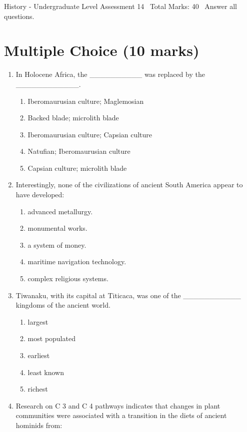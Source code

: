 \documentclass[12pt]{article}
\begin{document}
\begin{center}
History - Undergraduate Level Assessment 14 \
Total Marks: 40 \
Answer all questions.
\end{center}

\section*{Multiple Choice (10 marks)}
\begin{enumerate}[label=\arabic*.]
\item In Holocene Africa, the \_\_\_\_\_\_\_\_\_\_ was replaced by the \_\_\_\_\_\_\_\_\_\_\_\_.
\begin{enumerate}[label=(\alph*)]
    \item Iberomaurusian culture; Maglemosian
    \item Backed blade; microlith blade
    \item Iberomaurusian culture; Capsian culture
    \item Natufian; Iberomaurusian culture
    \item Capsian culture; microlith blade
\end{enumerate}
\item Interestingly, none of the civilizations of ancient South America appear to have developed:
\begin{enumerate}[label=(\alph*)]
    \item advanced metallurgy.
    \item monumental works.
    \item a system of money.
    \item maritime navigation technology.
    \item complex religious systems.
\end{enumerate}
\item Tiwanaku, with its capital at Titicaca, was one of the \_\_\_\_\_\_\_\_\_\_\_ kingdoms of the ancient world.
\begin{enumerate}[label=(\alph*)]
    \item largest
    \item most populated
    \item earliest
    \item least known
    \item richest
\end{enumerate}
\item Research on C 3 and C 4 pathways indicates that changes in plant communities were associated with a transition in the diets of ancient hominids from:

\end{enumerate}
\end{document}
